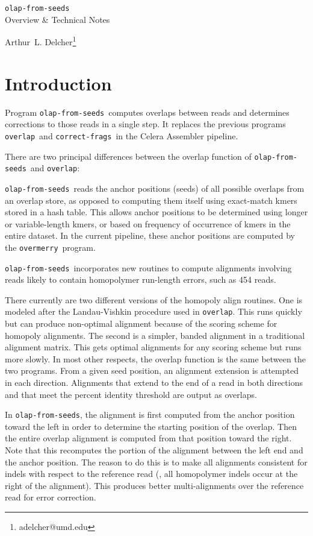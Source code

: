 \documentclass[letterpaper,11pt]{article}
\def\Pgm#1{\texttt{#1}}
\def\correctfrags{\Pgm{correct-frags}}
\def\ofs{\Pgm{olap-from-seeds}}
\def\overlap{\Pgm{overlap}}
\def\overmerry{\Pgm{overmerry}}
\newenvironment{technotes}{\bq\small\bf\bi\exdent{Technical Notes:}}{\ei\eq}
\def\btn{\begin{technotes}}
\def\etn{\end{technotes}}
\begin{document}
\pagestyle{PlainWithDate}
\thispagestyle{EmptyWithDate}
\RaggedRight

\bc\Large
  \ofs \smallskip\\
  Overview \& Technical Notes

  \bigskip
  \normalsize Arthur~L. Delcher\footnote{adelcher@umd.edu}
\ec

\section{Introduction}

Program \ofs\ computes overlaps between reads and determines
corrections to those reads in a single step.  It replaces the
previous programs \overlap\ and \correctfrags\ in the Celera
Assembler pipeline.

There are two principal differences between the overlap function
of \ofs\ and \overlap:
\bn
\item
  \ofs\ reads the anchor positions (seeds) of all possible overlaps
  from an overlap store, as opposed to computing them itself
  using exact-match kmers stored in a hash table.  This allows
  anchor positions to be determined using longer or variable-length
  kmers, or based on frequency of occurrence of kmers in the
  entire dataset.  In the current pipeline, these anchor positions
  are computed by the \overmerry\ program.
\item
  \ofs\ incorporates new routines to compute alignments involving
  reads likely to contain homopolymer run-length errors, such as
  454 reads.
  \btn
  \item
    There currently are two different versions of the homopoly
    align routines.  One is modeled after the Landau-Vishkin
    procedure used in \overlap.  This runs quickly but can produce
    non-optimal alignment because of the scoring scheme for
    homopoly alignments.  The second is a simpler, banded alignment
    in a traditional alignment matrix.  This gets optimal alignments
    for any scoring scheme but runs more slowly.
  \etn
\en
In most other respects, the overlap function is the same between
the two programs.  From a given seed position, an alignment
extension is attempted in each direction.  Alignments that
extend to the end of a read in both directions and that meet the
percent identity threshold are output as overlaps.
\btn
\item
  In \ofs, the alignment is first computed
  from the anchor position toward the left in order to determine the
  starting position of the overlap.  Then the entire overlap alignment
  is computed from that position toward the right.  Note that this
  recomputes the portion of the alignment between the left end and
  the anchor position.  The reason to do this is to make all alignments
  consistent for indels with respect to the reference read (\eg, all
  homopolymer indels occur at the right of the alignment).  This
  produces better multi-alignments over the reference read for
  error correction.
\end{document}

